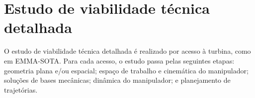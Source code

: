 \section{Estudo de viabilidade técnica detalhada}\label{sec::viatec}
O estudo de viabilidade técnica detalhada é realizado por acesso à turbina, como
em EMMA-SOTA. Para cada acesso, o estudo passa pelas seguintes etapas: geometria
plana e/ou espacial; espaço de trabalho e cinemática do
manipulador; soluções de bases mecânicas; dinâmica do manipulador; e
planejamento de trajetórias.


